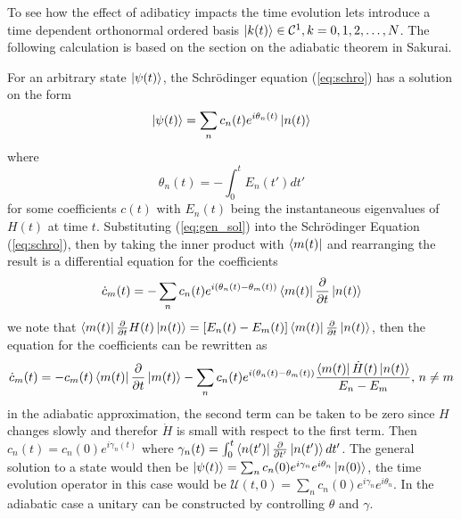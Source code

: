 To see how the effect of adibaticy impacts the time evolution lets introduce a time dependent orthonormal ordered basis $\ket{k(t)} \in \mathcal{C}^1, k = 0,1,2,\dots,N$. The following calculation is based on the section on the adiabatic theorem in Sakurai\cite{Sakurai}.

 For an arbitrary state $\ket{\psi(t)}$, the Schrödinger equation (\ref{eq:schro}) has a solution on the form 
\begin{equation}
\label{eq:gen_sol}
\ket{\psi(t)} = \sum_{n} c_n(t)e^{i\theta_n(t)}\ket{n(t)}
\end{equation}
where 
\begin{equation}
\theta_n(t) = -\int_0^t E_n(t')dt'
\end{equation}
for some coefficients $c(t)$ with $E_n(t)$ being the instantaneous eigenvalues of $H(t)$ at time $t$. Substituting (\ref{eq:gen_sol}) into the Schrödinger Equation (\ref{eq:schro}), then by taking the inner product with $\bra{m(t)}$ and rearranging the result is a differential equation for the coefficients 
\begin{equation}
\dot{c}_m(t) = -\sum_{n}c_n(t) e^{i(\theta_n(t) - \theta_m(t))}\bra{m(t)}\pdv{}{t}\ket{n(t)}
\end{equation}
we note that $\bra{m(t)}\pdv{}{t}H(t)\ket{n(t)} = [E_n(t) - E_m(t)]\bra{m(t)}\pdv{}{t}\ket{n(t)}$,
then the equation for the coefficients can be rewritten as
\begin{equation}
\label{eq:non-ad}
\dot{c}_m(t) = -c_m(t) \bra{m(t)}\pdv{}{t}\ket{m(t)} - \sum_{n}c_n(t)e^{i(\theta_n(t) - \theta_m(t))}\frac{\bra{m(t)}\dot{H}(t)\ket{n(t)} }{E_n - E_m},\, n \neq m
\end{equation} 
in the adiabatic approximation\cite{adiabatensatz}, the second term can be taken to be zero since $H$ changes slowly and therefor $\dot{H}$ is small with respect to the first term. 
Then $c_n(t) = c_n(0)e^{i\gamma_n(t)}$ where $\gamma_n(t) = \int_0^t \bra{n(t')}\pdv{}{t'}\ket{n(t')} dt'$.
The general solution to a state would then be $\ket{\psi(t)} = \sum_{n}c_n(0)e^{i\gamma_n}e^{i\theta_n}\ket{n(0)}$, the time evolution operator in this case would be $\mathcal{U}(t,0) = \sum_{n}c_n(0)e^{i\gamma_n}e^{i\theta_n}$. In the adiabatic case a unitary can be constructed by controlling $\theta$ and $\gamma$.

